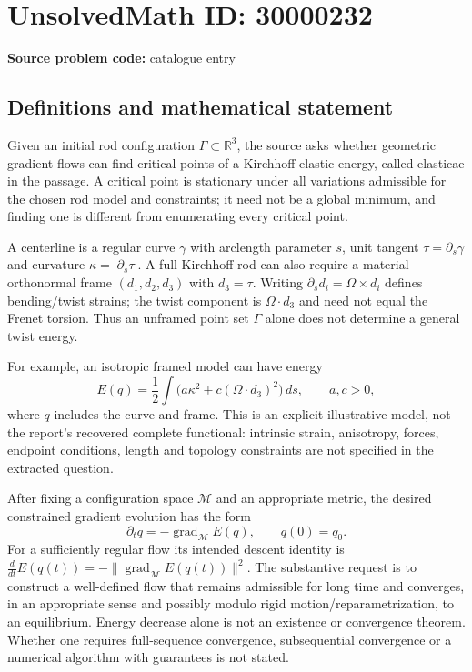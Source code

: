 \documentclass[11pt]{article}
\newcommand{\R}{\mathbb{R}}
\begin{document}
\section*{UnsolvedMath ID: 30000232}
\textbf{Source problem code:} catalogue entry
\subsection{Definitions and mathematical statement}
Given an initial rod configuration $\Gamma\subset\R^3$, the source asks whether geometric gradient flows can find critical points of a Kirchhoff elastic energy, called elasticae in the passage. A critical point is stationary under all variations admissible for the chosen rod model and constraints; it need not be a global minimum, and finding one is different from enumerating every critical point.

A centerline is a regular curve $\gamma$ with arclength parameter $s$, unit tangent $\tau=\partial_s\gamma$ and curvature $\kappa=|\partial_s\tau|$. A full Kirchhoff rod can also require a material orthonormal frame $(d_1,d_2,d_3)$ with $d_3=\tau$. Writing $\partial_sd_i=\Omega\times d_i$ defines bending/twist strains; the twist component is $\Omega\cdot d_3$ and need not equal the Frenet torsion. Thus an unframed point set $\Gamma$ alone does not determine a general twist energy.

For example, an isotropic framed model can have energy
\[
 E(q)=\frac12\int\bigl(a\kappa^2+c(\Omega\cdot d_3)^2\bigr)\,ds,
 \qquad a,c>0,
\]
where $q$ includes the curve and frame. This is an explicit illustrative model, not the report's recovered complete functional: intrinsic strain, anisotropy, forces, endpoint conditions, length and topology constraints are not specified in the extracted question.

After fixing a configuration space $\mathcal M$ and an appropriate metric, the desired constrained gradient evolution has the form
\[
 \partial_tq=-\operatorname{grad}_{\mathcal M}E(q),\qquad q(0)=q_0.
\]
For a sufficiently regular flow its intended descent identity is $\frac{d}{dt}E(q(t))=-\|\operatorname{grad}_{\mathcal M}E(q(t))\|^2$. The substantive request is to construct a well-defined flow that remains admissible for long time and converges, in an appropriate sense and possibly modulo rigid motion/reparametrization, to an equilibrium. Energy decrease alone is not an existence or convergence theorem. Whether one requires full-sequence convergence, subsequential convergence or a numerical algorithm with guarantees is not stated.
\end{document}
